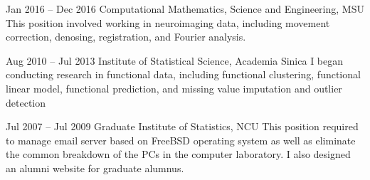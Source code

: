 \documentclass[10pt]{article} %
\begin{document}
\begin{paracol}{2}

  {Jan 2016 -- Dec 2016} %
  {Computational Mathematics, Science and Engineering, MSU} %
  {This position involved working in neuroimaging data, including movement correction, denosing, registration, and Fourier analysis.} %


  {Aug 2010 -- Jul 2013} %
  {Institute of Statistical Science, Academia Sinica} %
  {I began conducting research in functional data, including functional clustering, functional linear model, functional prediction, and missing value imputation and outlier detection}


  {Jul 2007 -- Jul 2009} %
  {Graduate Institute of Statistics, NCU} %
  {This position required to manage email server based on FreeBSD operating system as well as eliminate the common breakdown of the PCs in the computer laboratory. I also designed an alumni website for graduate alumnus.}


\end{paracol}
\end{document}
